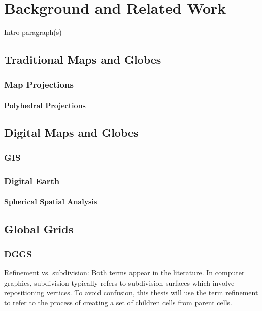 \chapter{Background and Related Work}

Intro paragraph(s)

\section{Traditional Maps and Globes}

\subsection{Map Projections}

\subsubsection{Polyhedral Projections}




\section{Digital Maps and Globes}

\subsection{GIS}

\subsection{Digital Earth}

\subsubsection{Spherical Spatial Analysis}




\section{Global Grids}

\subsection{DGGS}

Refinement vs. subdivision: Both terms appear in the literature. In computer graphics, subdivision typically refers to subdivision surfaces which involve repositioning vertices. To avoid confusion, this thesis will use the term refinement to refer to the process of creating a set of children cells from parent cells. 

